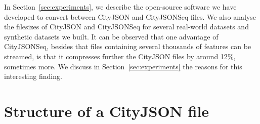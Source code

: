 \documentclass{isprs} %
\begin{document}
%

In Section~\ref{sec:experiments}, we describe  the open-source software we have developed to convert between CityJSON and CityJSONSeq files.
We also analyse the filesizes of CityJSON and CityJSONSeq for several real-world datasets and synthetic datasets we built.
It can be observed that one advantage of CityJSONSeq, besides that files containing several thousands of features can be streamed, is that it compresses further the CityJSON files by around 12\%, sometimes more.
We discuss in Section~\ref{sec:experiments} the reasons for this interesting finding.


%
\section{Structure of a CityJSON file}%
\label{sec:cityjson}
\end{document}
